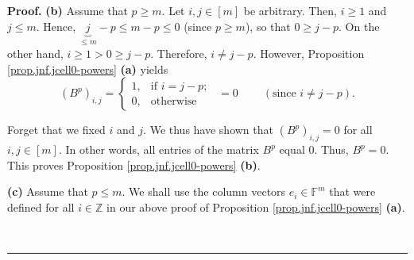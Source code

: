 \documentclass[numbers=enddot,12pt,final,onecolumn,notitlepage]{scrartcl}%
\numberwithin{exer}{subsection}
\theoremstyle{definition}
\newenvironment{proof}[1][Proof]{\noindent\textbf{#1.} }{\ \rule{0.5em}{0.5em}}
\begin{document}
\begin{proof}
\textbf{(b)} Assume that $p\geq m$. Let $i,j\in\left[  m\right]  $ be
arbitrary. Then, $i\geq1$ and $j\leq m$. Hence, $\underbrace{j}_{\leq m}-p\leq
m-p\leq0$ (since $p\geq m$), so that $0\geq j-p$. On the other hand,
$i\geq1>0\geq j-p$. Therefore, $i\neq j-p$. However, Proposition
\ref{prop.jnf.jcell0-powers} \textbf{(a)} yields
\[
\left(  B^{p}\right)  _{i,j}=%
\begin{cases}
1, & \text{if }i=j-p;\\
0, & \text{otherwise}%
\end{cases}
\ \ =0\ \ \ \ \ \ \ \ \ \ \left(  \text{since }i\neq j-p\right)  .
\]


Forget that we fixed $i$ and $j$. We thus have shown that $\left(
B^{p}\right)  _{i,j}=0$ for all $i,j\in\left[  m\right]  $. In other words,
all entries of the matrix $B^{p}$ equal $0$. Thus, $B^{p}=0$. This proves
Proposition \ref{prop.jnf.jcell0-powers} \textbf{(b)}. \medskip

\textbf{(c)} Assume that $p\leq m$. We shall use the column vectors $e_{i}%
\in\mathbb{F}^{m}$ that were defined for all $i\in\mathbb{Z}$ in our above
proof of Proposition \ref{prop.jnf.jcell0-powers} \textbf{(a)}.


\end{proof}
\end{document}
